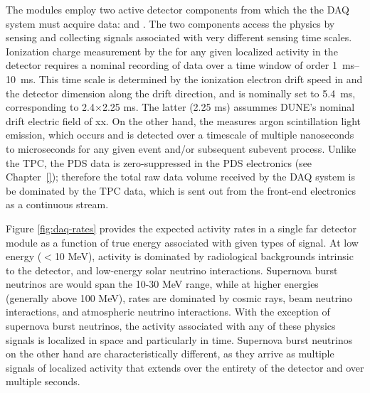 The   modules employ two
active detector components from which the the DAQ system must acquire data:  and . The two components access the physics %
by sensing and collecting signals associated with very different 
sensing time scales.
Ionization charge measurement by the  for any given
localized activity in the detector requires a
nominal recording of data over a time window of order 
\SIrange{1}{10}{\milli\second}. 
This time scale is determined by the ionization electron drift speed in
\lar and the detector dimension along the drift direction, and is
nominally set to 5.4~ms, corresponding to 2.4$\times$2.25 ms. The
latter (2.25 ms) assummes DUNE's nominal drift electric field of xx.
On the other hand, the  measures argon scintillation light emission, which
occurs and is detected over a timescale of multiple nanoseconds to
microseconds for
any given event and/or subsequent subevent process. Unlike the TPC,
the PDS data is zero-suppressed in
the PDS electronics (see Chapter~\ref{}); therefore the total raw data volume received by
the DAQ system is be dominated by
the TPC data, which is sent out from the front-end electronics as a continuous stream.
 
Figure \ref{fig:daq-rates} provides the expected activity rates in a
single far detector module as a function of true energy associated
with given types of signal.
At low energy ($<$10 MeV), activity is dominated by radiological backgrounds
intrinsic to the detector, and
low-energy solar neutrino interactions. Supernova burst neutrinos are
would span the 10-30 MeV range, while at higher energies (generally
above 100 MeV), rates are dominated by cosmic rays, beam neutrino interactions,
and atmospheric neutrino interactions. With the exception of supernova
burst neutrinos, the activity associated with any of these physics
signals is localized in space and particularly in time. Supernova burst
neutrinos on the other hand are characteristically different, as they arrive as multiple
signals of localized activity that extends over the entirety of the
detector and over multiple seconds. 

